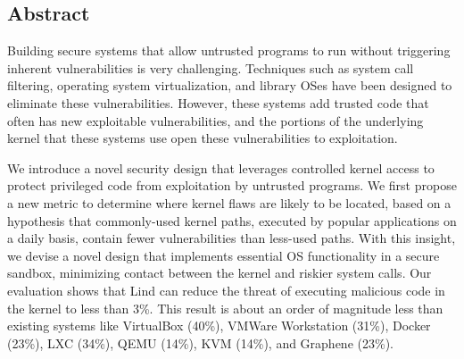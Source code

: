 \subsection*{Abstract}
Building secure systems that allow untrusted programs to run without
triggering inherent vulnerabilities %
is very challenging. 
Techniques such as system call filtering,
operating system virtualization, and library OSes have been designed to  
eliminate these vulnerabilities.
However, 
these systems add trusted code that often has new
exploitable vulnerabilities, and the portions of the underlying kernel
that these systems use open these vulnerabilities to exploitation.

We introduce a novel security design that leverages
controlled kernel access to protect privileged code from exploitation by
untrusted programs.
We first propose a new metric to determine where kernel flaws are
likely to be located, based on a hypothesis that commonly-used kernel
paths, executed by popular applications on a daily basis, contain fewer
vulnerabilities than less-used paths. With this insight, we devise a
novel design that implements essential OS functionality in  a
secure sandbox, minimizing contact between the kernel and riskier system calls.
Our evaluation shows that Lind can reduce the threat of
executing malicious code in the kernel to less than 3\%.
This result is about an order of magnitude less than existing systems like VirtualBox (40\%),
VMWare Workstation (31\%), Docker (23\%), LXC (34\%), QEMU (14\%), KVM (14\%), and Graphene (23\%).